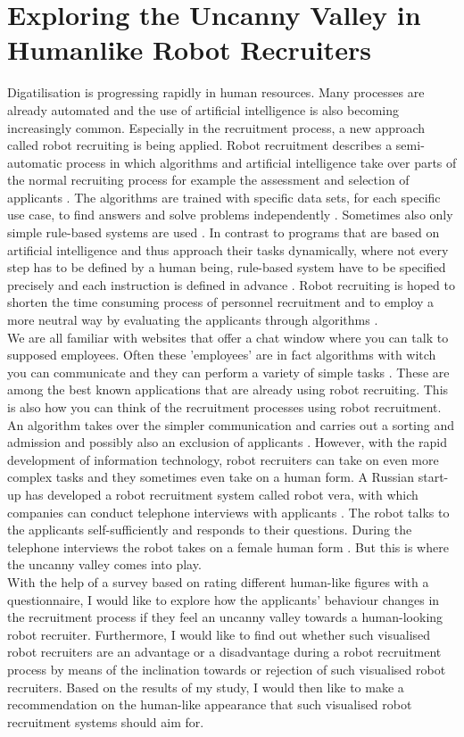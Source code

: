 \chapter{Exploring the Uncanny Valley in Humanlike Robot Recruiters}
Digatilisation is progressing rapidly in human resources. Many processes are already automated and the use of artificial intelligence is also becoming increasingly common. Especially in the recruitment process, a new approach called robot recruiting is being applied. Robot recruitment describes a semi-automatic process in which algorithms and artificial intelligence take over parts of the normal recruiting process for example the assessment and selection of applicants \cite{robot_recruiting}. The algorithms are trained with specific data sets, for each specific use case, to find answers and solve problems independently \cite{robot_recruiting_avant}. Sometimes also only simple rule-based systems are used \cite{robot_recruiting_avant}. In contrast to programs that are based on artificial intelligence and thus approach their tasks dynamically, where not every step has to be defined by a human being, rule-based system have to be specified precisely and each instruction is defined in advance \cite{robot_recruiting_avant}. Robot recruiting is hoped to shorten the time consuming process of personnel recruitment and to employ a more neutral way by evaluating the applicants through algorithms \cite{robot_recruiting}.\\
We are all familiar with websites that offer a chat window where you can talk to supposed employees. Often these 'employees' are in fact algorithms with witch you can communicate and they can perform a variety of simple tasks \cite{robot_recruiting}. These are among the best known applications that are already using robot recruiting. This is also how you can think of the recruitment processes using robot recruitment. An algorithm takes over the simpler communication and carries out a sorting and admission and possibly also an exclusion of applicants \cite{robot_recruiting}. However, with the rapid development of information technology, robot recruiters can take on even more complex tasks and they sometimes even take on a human form. A Russian start-up has developed a robot recruitment system called robot vera, with which companies can conduct telephone interviews with applicants \cite{robot_recruiting}. The robot talks to the applicants self-sufficiently and responds to their questions. During the telephone interviews the robot takes on a female human form \cite{robot_recruiting}. But this is where the uncanny valley comes into play.\\
With the help of a survey based on rating different human-like figures with a questionnaire, I would like to explore how the applicants' behaviour changes in the recruitment process if they feel an uncanny valley towards a human-looking robot recruiter.
Furthermore, I would like to find out whether such visualised robot recruiters are an advantage or a disadvantage during a robot recruitment process by means of the inclination towards or rejection of such visualised robot recruiters. Based on the results of my study, I would then like to make a recommendation on the human-like appearance that such visualised robot recruitment systems should aim for. 